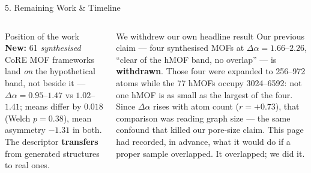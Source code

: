 \documentclass[aspectratio=169, 11pt]{beamer}
\begin{document}
\begin{frame}{5. Remaining Work \& Timeline}
\begin{columns}[T]
\begin{block}{\footnotesize Position of the work}
\vspace{0.08cm}
\textbf{New:} 61 \textit{synthesised} CoRE MOF frameworks land \textit{on} the hypothetical
band, not beside it --- $\Delta\alpha=0.95$--$1.47$ vs $1.02$--$1.41$; means differ by
$0.018$ (Welch $p=0.38$), mean asymmetry $-1.31$ in both. The descriptor \textbf{transfers}
from generated structures to real ones.
\end{block}
\begin{block}{\footnotesize We withdrew our own headline result}
\scriptsize
Our previous claim --- four synthesised MOFs at $\Delta\alpha=1.66$--$2.26$, ``clear of the
hMOF band, no overlap'' --- is \textbf{withdrawn}. Those four were expanded to 256--972
atoms while the 77 hMOFs occupy 3024--6592: not one hMOF is as small as the largest of the
four. Since $\Delta\alpha$ rises with atom count ($r=+0.73$), that comparison was reading
graph size --- the same confound that killed our pore-size claim. This page had recorded, in
advance, what it would do if a proper sample overlapped. It overlapped; we did it.
\end{block}
\end{columns}
\end{frame}
\end{document}
